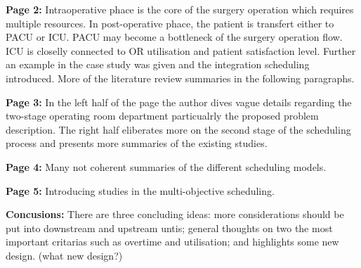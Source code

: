     \textbf{Page 2:}
    Intraoperative phace is the core of the surgery operation which requires multiple resources. In post-operative phace, the patient is transfert either to PACU or ICU. PACU may become a bottleneck of the surgery operation flow. ICU is closelly connected to OR utilisation and patient satisfaction level. Further an example in the case study was given and the integration scheduling introduced. More of the literature review summaries in the following paragraphs.
    
    \textbf{Page 3:}
    In the left half of the page the author dives vague details regarding the two-stage operating room department particualrly the proposed problem description. The right half eliberates more on the second stage of the scheduling process and presents more summaries of the existing studies.
    
    \textbf{Page 4:}
    Many not coherent summaries of the different scheduling models.
    
    \textbf{Page 5:}
    Introducing studies in the multi-objective scheduling.
    
    \textbf{Concusions:}
    There are three concluding ideas: more considerations should be put into downstream and upstream untis; general thoughts on two the most important critarias such as overtime and utilisation; and highlights some new design. (what new design?)